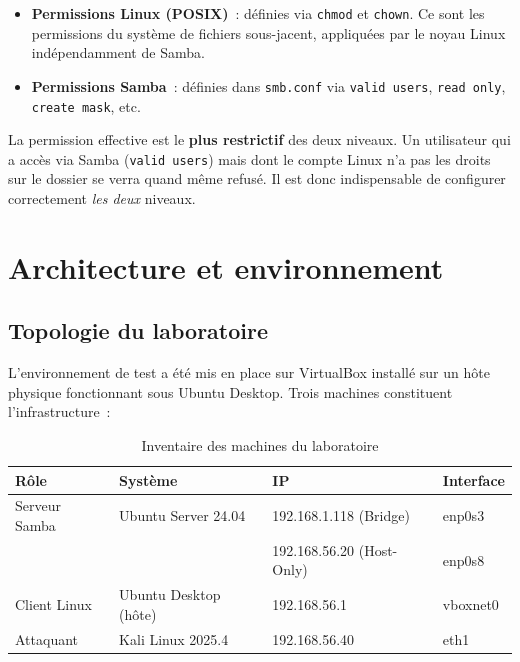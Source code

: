 \documentclass[12pt,a4paper]{article}
\begin{document}
\begin{itemize}[leftmargin=2em]
  \item \textbf{Permissions Linux (POSIX)}~: définies via \texttt{chmod} et \texttt{chown}.
    Ce sont les permissions du système de fichiers sous-jacent, appliquées par le noyau Linux
    indépendamment de Samba.
  \item \textbf{Permissions Samba}~: définies dans \texttt{smb.conf} via \texttt{valid users},
    \texttt{read only}, \texttt{create mask}, etc.
\end{itemize}

\begin{infobox}
La permission effective est le \textbf{plus restrictif} des deux niveaux. Un utilisateur qui
a accès via Samba (\texttt{valid users}) mais dont le compte Linux n'a pas les droits sur
le dossier se verra quand même refusé. Il est donc indispensable de configurer
correctement \textit{les deux} niveaux.
\end{infobox}

\section{Architecture et environnement}

\subsection{Topologie du laboratoire}

L'environnement de test a été mis en place sur VirtualBox installé sur un hôte physique
fonctionnant sous Ubuntu Desktop. Trois machines constituent l'infrastructure~:

\begin{table}[H]
  \centering
  \begin{tabular}{llll}
    \toprule
    \textbf{Rôle} & \textbf{Système} & \textbf{IP} & \textbf{Interface} \\
    \midrule
    Serveur Samba & Ubuntu Server 24.04 & 192.168.1.118 (Bridge)    & enp0s3 \\
                  &                     & 192.168.56.20 (Host-Only) & enp0s8 \\
    Client Linux  & Ubuntu Desktop (hôte) & 192.168.56.1            & vboxnet0 \\
    Attaquant     & Kali Linux 2025.4   & 192.168.56.40             & eth1 \\
    \bottomrule
  \end{tabular}
  \caption{Inventaire des machines du laboratoire}
\end{table}
\end{document}
